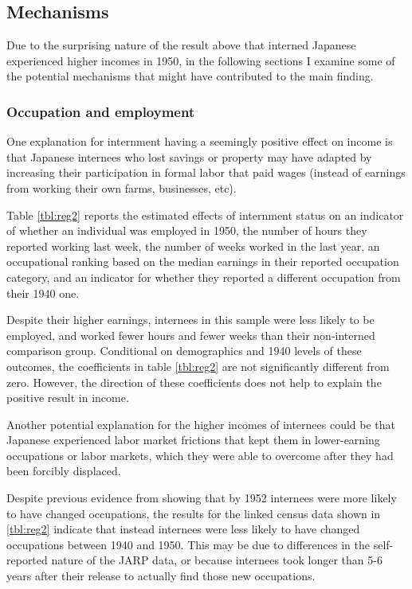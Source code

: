 \subsection{Mechanisms}

Due to the surprising nature of the result above 
that interned Japanese experienced higher incomes in 1950,
in the following sections I examine some of the potential mechanisms
that might have contributed to the main finding.

\subsubsection{Occupation and employment}

One explanation for internment having a seemingly positive effect on income
is that Japanese internees who lost savings or property may have adapted
by increasing their participation in formal labor that paid wages
(instead of earnings from working their own farms, businesses, etc).

Table \ref{tbl:reg2} reports the estimated effects of internment status
on an indicator of whether an individual was employed in 1950,
the number of hours they reported working last week,
the number of weeks worked in the last year,
an occupational ranking based on the median earnings in their reported occupation category,
and an indicator for whether they reported a different occupation from their 1940 one.



Despite their higher earnings, 
internees in this sample were less likely to be employed,
and worked fewer hours and fewer weeks than their non-interned comparison group.
Conditional on demographics and 1940 levels of these outcomes,
the coefficients in table \ref{tbl:reg2} are not significantly different from zero.
However, the direction of these coefficients 
does not help to explain the positive result in income.

Another potential explanation for the higher incomes of internees
could be that Japanese experienced labor market frictions
that kept them in lower-earning occupations or labor markets,
which they were able to overcome after they had been
forcibly displaced.

Despite previous evidence from \cite{arellano-boverDisplacementDiversityMobility2022}
showing that by 1952 internees were more likely to have changed occupations,
the results for the linked census data shown in \ref{tbl:reg2}
indicate that instead internees were less likely to have changed occupations
between 1940 and 1950.
This may be due to differences in the self-reported nature of the JARP data,
or because internees took longer than 5-6 years after their release
to actually find those new occupations.

